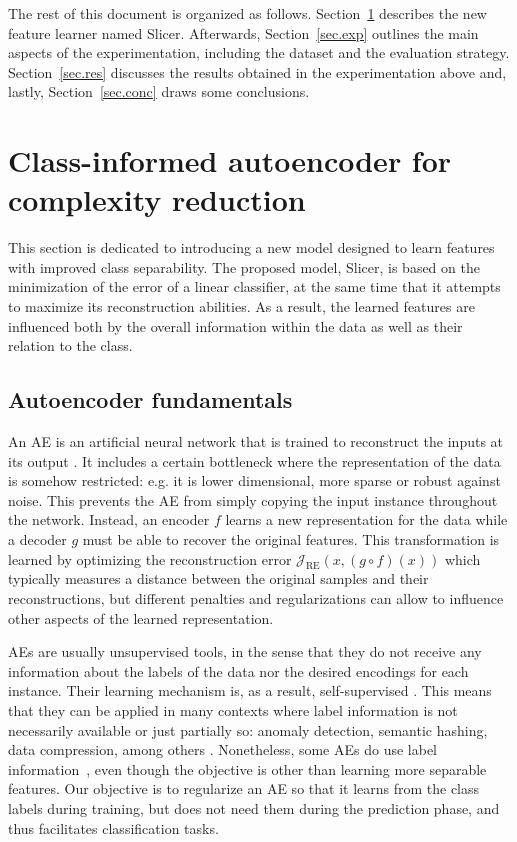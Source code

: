 \documentclass[
	fontsize=11pt, %
	twoside=false, %
	open=any, %
	secnumdepth=1, %
]{kaobook}
\begin{document}
The rest of this document is organized as follows. Section~\ref{sec.method} describes the new feature learner named Slicer. Afterwards, Section~\ref{sec.exp} outlines the main aspects of the experimentation, including the dataset and the evaluation strategy. Section~\ref{sec.res} discusses the results obtained in the experimentation above and, lastly, Section~\ref{sec.conc} draws some conclusions.

\section{Class-informed autoencoder for complexity reduction}\label{sec.method}

This section is dedicated to introducing a new model designed to learn features with improved class separability. The proposed model, Slicer, is based on the minimization of the error of a linear classifier, at the same time that it attempts to maximize its reconstruction abilities. As a result, the learned features are influenced both by the overall information within the data as well as their relation to the class.

\subsection{Autoencoder fundamentals}

An AE is an artificial neural network that is trained to reconstruct the inputs at its output \cite{charte-tutorial}. It includes a certain bottleneck where the representation of the data is somehow restricted: e.g. it is lower dimensional, more sparse or robust against noise. This prevents the AE from simply copying the input instance throughout the network. Instead, an encoder $f$ learns a new representation for the data while a decoder $g$ must be able to recover the original features. This transformation is learned by optimizing the reconstruction error $\mathcal J_{\operatorname{RE}}(x,(g\circ f)(x))$ which typically measures a distance between the original samples and their reconstructions, but different penalties and regularizations can allow to influence other aspects of the learned representation.

AEs are usually unsupervised tools, in the sense that they do not receive any information about the labels of the data nor the desired encodings for each instance. Their learning mechanism is, as a result, self-supervised \cite{liu2020self}. This means that they can be applied in many contexts where label information is not necessarily available or just partially so: anomaly detection, semantic hashing, data compression, among others \cite{CHARTE202093}. Nonetheless, some AEs do use label information~\cite{makhzani2015adversarial}, even though the objective is other than learning more separable features. Our objective is to regularize an AE so that it learns from the class labels during training, but does not need them during the prediction phase, and thus facilitates classification tasks.
\end{document}

